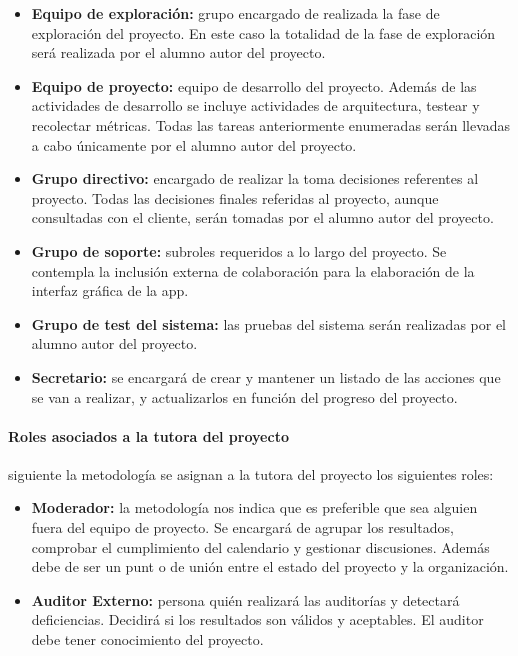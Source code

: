 \begin{itemize}
    \item \textbf{Equipo de exploración: }grupo encargado de realizada la fase de exploración del proyecto. En este caso la totalidad de la fase de exploración será realizada por el alumno autor del proyecto. 
    \item\textbf{Equipo de proyecto: }equipo de desarrollo del proyecto. Además de las actividades de desarrollo se incluye actividades de arquitectura, testear y recolectar métricas. Todas las tareas anteriormente enumeradas serán llevadas a cabo únicamente por el alumno autor del proyecto.
    \item \textbf{Grupo directivo: }encargado de realizar la toma decisiones referentes al proyecto. Todas las decisiones finales referidas al proyecto, aunque consultadas con el cliente, serán tomadas por el alumno autor del proyecto.
    \item \textbf{Grupo de soporte: }subroles requeridos a lo largo del proyecto. Se contempla la inclusión externa de colaboración para la elaboración de la interfaz gráfica de la app.
    \item \textbf{Grupo de test del sistema: }las pruebas del sistema serán realizadas por el alumno autor del proyecto.
    \item \textbf{Secretario: }se encargará de crear y mantener un listado de las acciones que se van a realizar, y actualizarlos en función del progreso del proyecto. 
\end{itemize}

\paragraph{Roles asociados a la tutora del proyecto}siguiente la metodología se asignan a la tutora del proyecto los siguientes roles:
\begin{itemize}
    \item \textbf{Moderador: }la metodología nos indica que es preferible que sea alguien fuera del equipo de proyecto. Se encargará de agrupar los resultados, comprobar el cumplimiento del calendario y gestionar discusiones. Además debe de ser un punt o de unión entre el estado del proyecto y la organización. 
    \item \textbf{Auditor Externo: }persona quién realizará las auditorías y detectará deficiencias. Decidirá si los resultados son válidos y aceptables. El auditor debe tener conocimiento del proyecto. 
\end{itemize}
